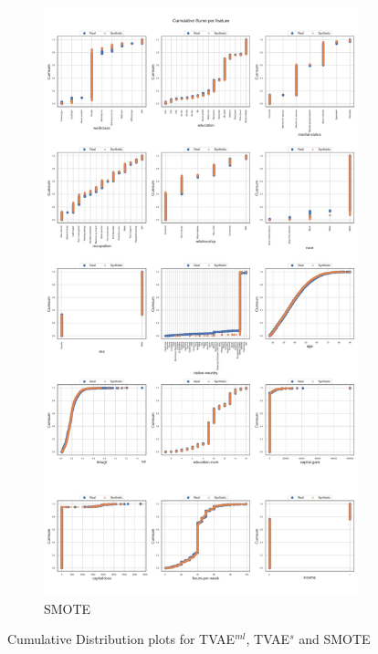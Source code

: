 \begin{landscape}
\begin{figure}[h]
\begin{subfigure}{0.3\linewidth}
			\includegraphics[height=\textheight,width=\linewidth,keepaspectratio]{images/cumsums/smote.jpg}
			\caption{SMOTE}
		\end{subfigure}
		\caption{Cumulative Distribution plots for TVAE$^{ml}$, TVAE$^s$ and SMOTE}
		\label{fig_a:cumsum_2}
	\end{figure}
\end{landscape}
